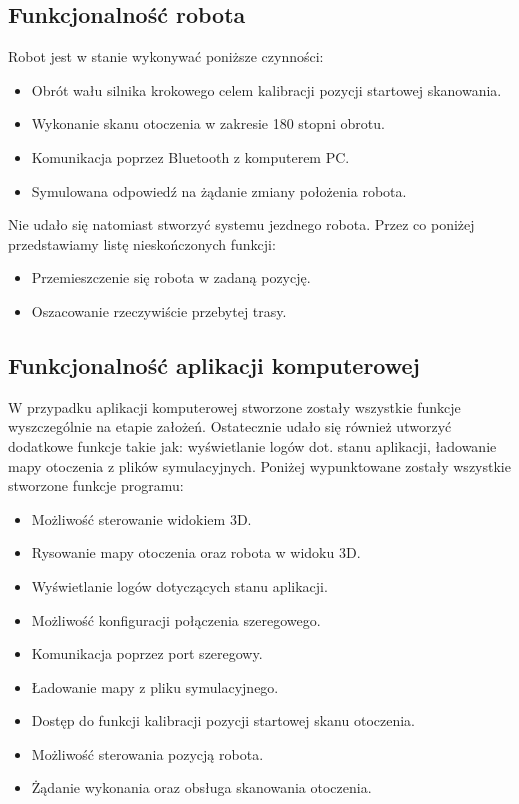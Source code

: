 \documentclass[a4paper]{article}
\begin{document}
\subsection{Funkcjonalność robota}
Robot jest w stanie wykonywać poniższe czynności:
\begin{itemize}
\item Obrót wału silnika krokowego celem kalibracji pozycji startowej skanowania.
\item Wykonanie skanu otoczenia w zakresie 180 stopni obrotu. 
\item Komunikacja poprzez Bluetooth z komputerem PC.
\item Symulowana odpowiedź na żądanie zmiany położenia robota.
\end{itemize}
Nie udało się natomiast stworzyć systemu jezdnego robota. Przez co poniżej przedstawiamy listę nieskończonych funkcji:
\begin{itemize}
\item Przemieszczenie się robota w zadaną pozycję.
\item Oszacowanie rzeczywiście przebytej trasy.
\end{itemize}
\subsection{Funkcjonalność aplikacji komputerowej}
W przypadku aplikacji komputerowej stworzone zostały wszystkie funkcje wyszczególnie na etapie założeń. Ostatecznie udało się również utworzyć dodatkowe funkcje takie jak: wyświetlanie logów dot. stanu aplikacji, ładowanie mapy otoczenia z plików symulacyjnych. Poniżej wypunktowane zostały wszystkie stworzone funkcje programu:
\begin{itemize}
\item Możliwość sterowanie widokiem 3D.
\item Rysowanie mapy otoczenia oraz robota w widoku 3D.
\item Wyświetlanie logów dotyczących stanu aplikacji.
\item Możliwość konfiguracji połączenia szeregowego.
\item Komunikacja poprzez port szeregowy.
\item Ładowanie mapy z pliku symulacyjnego.
\item Dostęp do funkcji kalibracji pozycji startowej skanu otoczenia.
\item Możliwość sterowania pozycją robota.
\item Żądanie wykonania oraz obsługa skanowania otoczenia.
\end{itemize}
\end{document}

